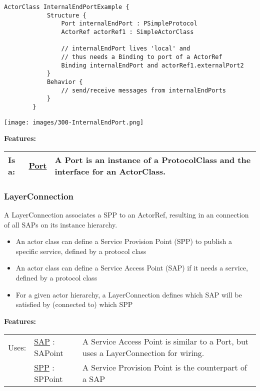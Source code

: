 		\begin{lstlisting}[language=ROOM]
		ActorClass InternalEndPortExample {
			Structure {
				Port internalEndPort : PSimpleProtocol
				ActorRef actorRef1 : SimpleActorClass
				
				// internalEndPort lives 'local' and
				// thus needs a Binding to port of a ActorRef
				Binding internalEndPort and actorRef1.externalPort2 
			}
			Behavior {
				// send/receive messages from internalEndPorts
			}
		}
		\end{lstlisting}
		\texttt{[image: images/300-InternalEndPort.png]}
		
		
		\begingroup
		\textbf{Features:}
		\renewcommand{\arraystretch}{1.8} %
		\begin{longtable}{l|l p{}}
			\hline
		Is a: & \tabitem \hyperlink{ref:Port}{Port}  & A Port is an instance of a ProtocolClass and the interface for an ActorClass.\\
		\hline
		\end{longtable}
		\endgroup
		
		
		
	\vspace{\baselineskip}
	\vspace{\baselineskip}
	\vspace{\baselineskip}
	
	\subsubsection{LayerConnection}
		\hypertarget{ref:LayerConnection}{}
		
		A LayerConnection associates a SPP to an ActorRef, resulting in an connection of all SAPs on its instance hierarchy.
		
		\begin{itemize}
		\item An actor class can define a Service Provision Point (SPP) to publish a specific service, defined by a protocol class
		\item An actor class can define a Service Access Point (SAP) if it needs a service, defined by a protocol class
		\item For a given actor hierarchy, a LayerConnection defines which SAP will be satisfied by (connected to) which SPP
		\end{itemize}
		
		
		\begingroup
		\textbf{Features:}
		\renewcommand{\arraystretch}{1.8} %
		\begin{longtable}{l|l p{}}
			\hline
		Uses: & \tabitem \hyperlink{ref:SAP}{SAP} : SAPoint & A Service Access Point is similar to a Port, but uses a LayerConnection for wiring.\\
		& \tabitem \hyperlink{ref:SPP}{SPP} : SPPoint & A Service Provision Point is the counterpart of a SAP \\
		\hline
		\end{longtable}
		\endgroup
		
